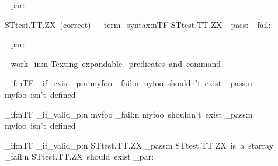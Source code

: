 \documentclass{article}
\begin{document}
\sttests_par:

STtest.TT.ZX~(correct)~
\starray_term_syntax:nTF {STtest.TT.ZX}
  {\sttests_pass:}
  {\sttests_fail:}

\sttests_par:




\sttests_work_in:n {Texting~expandable~ predicates~and~command}


\bool_if:nTF {\starray_if_exist_p:n {myfoo}}
  {\sttests_fail:n {myfoo~shouldn't~exist}}
  { \sttests_pass:n {myfoo~isn't~defined}}

\bool_if:nTF {\starray_if_valid_p:n {myfoo}}
  {\sttests_fail:n {myfoo~shouldn't~exist}}
  { \sttests_pass:n {myfoo~isn't~defined}}

\bool_if:nTF {\starray_if_valid_p:n {STtest.TT.ZX}}
  {\sttests_pass:n {STtest.TT.ZX~is~a~starray}}
  { \sttests_fail:n {STtest.TT.ZX~should~exist}}
\sttests_par:
\end{document}
